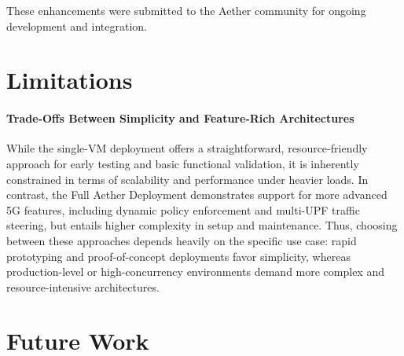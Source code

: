 These enhancements were submitted to the Aether community for ongoing development and integration.



\section{Limitations}
\paragraph{Trade-Offs Between Simplicity and Feature-Rich Architectures}
While the single-VM deployment offers a straightforward, resource-friendly approach for 
early testing and basic functional validation, it is inherently constrained in terms of 
scalability and performance under heavier loads. In contrast, the Full Aether Deployment 
demonstrates support for more advanced 5G features, including dynamic policy 
enforcement and multi-UPF traffic steering, but entails higher complexity in setup and 
maintenance. Thus, choosing between these approaches depends heavily on the specific 
use case: rapid prototyping and proof-of-concept deployments favor simplicity, whereas 
production-level or high-concurrency environments demand more complex and 
resource-intensive architectures.

\section{Future Work}
